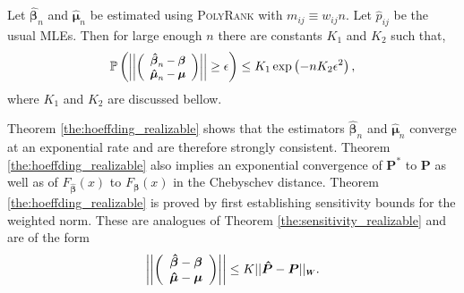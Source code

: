 \documentclass[twoside,11pt]{article}
\newcommand*{\Scale}[2][4]{\scalebox{#1}{$#2$}}%
\begin{document}
\begin{theorem}%
\label{the:hoeffding_realizable}
Let $\boldsymbol{\hat{\beta}}_n$ and $\boldsymbol{\hat{\mu}}_n$ be estimated using \textsc{PolyRank} with $m_{ij} \equiv w_{ij} n$. Let $\hat{p}_{ij}$ be the usual MLEs. Then for large enough $n$ there are constants $K_1$ and $K_2$ such that, 
\begin{equation}
\label{eq:hoeffding_realizable}
\mathbb{P}\left(\Scale[.9]{\left|\left|\left(\begin{array}{c}
     \boldsymbol{\hat{\beta}}_n -\boldsymbol{\beta}\\
     \boldsymbol{\hat{\mu}}_n -\boldsymbol{\mu} 
\end{array}\right) \right|\right|}\geq \epsilon \right) \leq K_1\exp\left(-n K_2   \epsilon^2 \right),\end{equation}
where $K_1$ and $K_2 $ are discussed bellow. 
\end{theorem}

Theorem \ref{the:hoeffding_realizable} shows that the estimators $\boldsymbol{\hat{\beta}}_n$ and $\boldsymbol{\hat{\mu}}_n$ converge at an exponential rate and are therefore strongly consistent. Theorem \ref{the:hoeffding_realizable} also implies an exponential convergence of $\boldsymbol{P}^*$ to $\boldsymbol{P}$ as well as of $F_{\boldsymbol{\hat \beta}}(x)$ to $ F_{\boldsymbol{ \beta}}(x)$ in the Chebyschev distance. Theorem \ref{the:hoeffding_realizable} is proved by first establishing sensitivity bounds for the weighted norm. These are analogues of Theorem \ref{the:sensitivity_realizable} and are of the form
\begin{equation}
\label{eq:weighted_parameter_sensitivity}\left|\left|\left(\begin{array}{c}
     \boldsymbol{\hat{\beta}} -\boldsymbol{\beta}\\
     \boldsymbol{\hat{\mu}} -\boldsymbol{\mu} 
\end{array}\right) \right|\right| \leq K ||\boldsymbol{\hat P} - \boldsymbol{P}||_{\Scale[.6]{\boldsymbol{W}}}.\end{equation}
\end{document}

